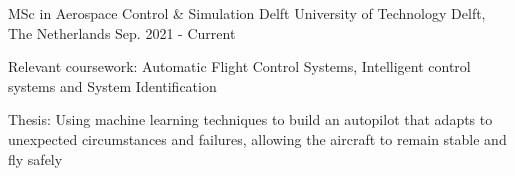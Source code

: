   \cventry
    {MSc in Aerospace Control \& Simulation} %
    {Delft University of Technology} %
    {Delft, The Netherlands} %
    {Sep. 2021 - Current} %
    {
      \begin{cvitems} %
        \item {Relevant coursework: Automatic Flight Control Systems, Intelligent control systems and System Identification}
        \item {Thesis: Using machine learning techniques to build an autopilot that adapts to unexpected circumstances and failures, allowing the aircraft to remain stable and fly safely}
      \end{cvitems}
    }

